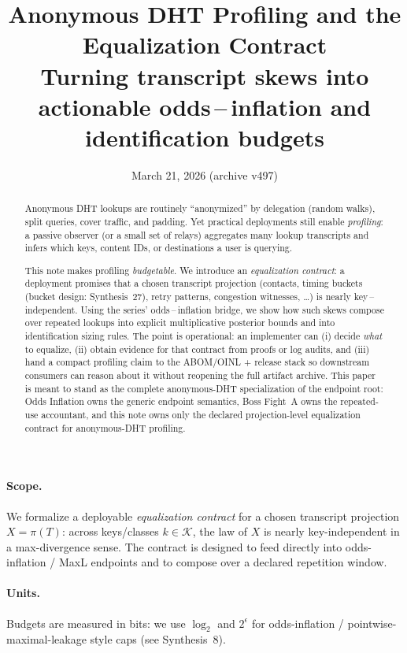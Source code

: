 \documentclass[11pt]{article}
\title{Anonymous DHT Profiling and the Equalization Contract\\
\large Turning transcript skews into actionable odds\,--\,inflation and identification budgets}
\author{}
\date{March 21, 2026 (archive v497)}
\begin{document}
\maketitle

\begin{abstract}
Anonymous DHT lookups are routinely ``anonymized'' by delegation (random walks), split queries, cover traffic, and padding.
Yet practical deployments still enable \emph{profiling}: a passive observer (or a small set of relays) aggregates many lookup transcripts and infers which keys, content IDs, or destinations a user is querying.

This note makes profiling \emph{budgetable}.
We introduce an \emph{equalization contract}: a deployment promises that a chosen transcript projection (contacts, timing buckets (bucket design: Synthesis~27)\cite{series:bucketdesign}, retry patterns, congestion witnesses, \dots) is nearly key\,--\,independent.
Using the series' odds\,--\,inflation bridge, we show how such skews compose over repeated lookups into explicit multiplicative posterior bounds and into identification sizing rules.
The point is operational: an implementer can (i) decide \emph{what} to equalize, (ii) obtain evidence for that contract from proofs or log audits, and (iii) hand a compact profiling claim to the ABOM/OINL + release stack so downstream consumers can reason about it without reopening the full artifact archive.
This paper is meant to stand as the complete anonymous-DHT specialization of the endpoint root: Odds Inflation owns the generic endpoint semantics, Boss Fight~A owns the repeated-use accountant, and this note owns only the declared projection-level equalization contract for anonymous-DHT profiling.
\end{abstract}


\paragraph{Scope.}
We formalize a deployable \emph{equalization contract} for a chosen transcript projection $X=\pi(T)$:
across keys/classes $k\in\mathcal K$, the law of $X$ is nearly key-independent in a max-divergence sense.
The contract is designed to feed directly into odds-inflation / MaxL endpoints and to compose over a declared repetition window.

\paragraph{Units.} Budgets are measured in bits: we use $\log_2$ and $2^{\epsilon}$ for odds-inflation / pointwise-maximal-leakage style caps (see Synthesis~8).\cite{series:notation}
\end{document}
